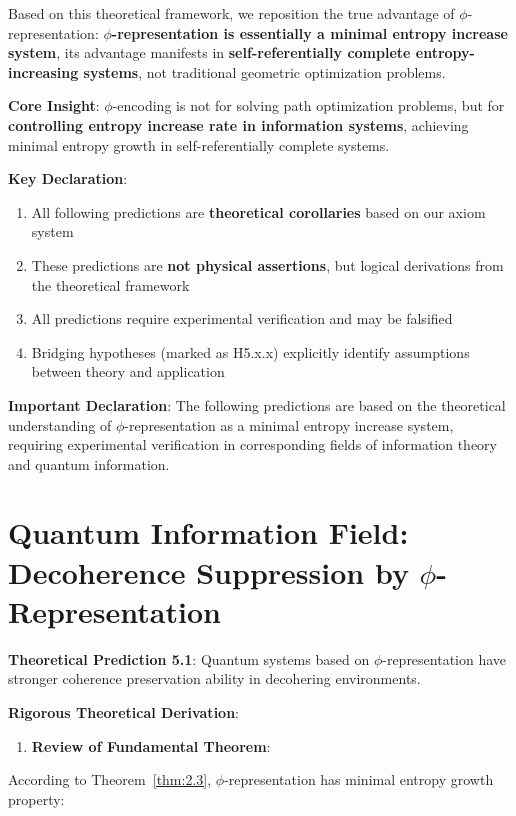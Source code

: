 
Based on this theoretical framework, we reposition the true advantage of $\phi$-representation: \textbf{$\phi$-representation is essentially a minimal entropy increase system}, its advantage manifests in \textbf{self-referentially complete entropy-increasing systems}, not traditional geometric optimization problems.

\textbf{Core Insight}: $\phi$-encoding is not for solving path optimization problems, but for \textbf{controlling entropy increase rate in information systems}, achieving minimal entropy growth in self-referentially complete systems.

\textbf{Key Declaration}:
\begin{enumerate}
\item All following predictions are \textbf{theoretical corollaries} based on our axiom system
\item These predictions are \textbf{not physical assertions}, but logical derivations from the theoretical framework
\item All predictions require experimental verification and may be falsified
\item Bridging hypotheses (marked as H5.x.x) explicitly identify assumptions between theory and application
\end{enumerate}

\textbf{Important Declaration}: The following predictions are based on the theoretical understanding of $\phi$-representation as a minimal entropy increase system, requiring experimental verification in corresponding fields of information theory and quantum information.

\section{Quantum Information Field: Decoherence Suppression by $\phi$-Representation}
\label{sec:ch07_applications:quantum-information-field-decoherence-suppression-by-phi-representation}

\textbf{Theoretical Prediction 5.1}: Quantum systems based on $\phi$-representation have stronger coherence preservation ability in decohering environments.

\textbf{Rigorous Theoretical Derivation}:

\begin{enumerate}
\item \textbf{Review of Fundamental Theorem}:
\end{enumerate}
   According to Theorem~\ref{thm:2.3}, $\phi$-representation has minimal entropy growth property:
   
